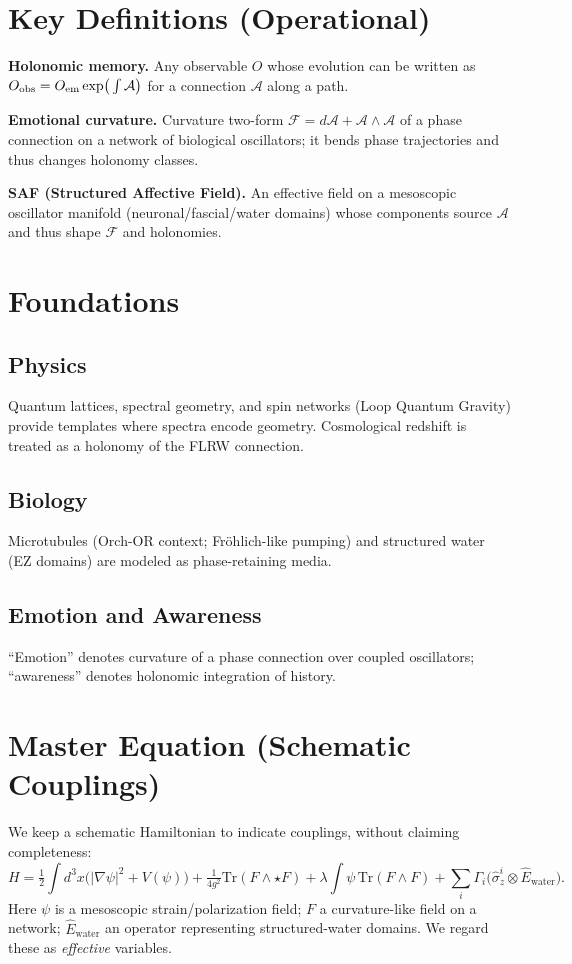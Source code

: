 \documentclass[11pt]{article}
\begin{document}
\section{Key Definitions (Operational)}
\textbf{Holonomic memory.} Any observable $O$ whose evolution can be written as
$O_{\rm obs}=O_{\rm em}\exp\!\big(\int \mathcal{A}\big)$ for a connection $\mathcal{A}$ along a path.
\smallskip

\noindent
\textbf{Emotional curvature.} Curvature two-form $\mathcal{F}=d\mathcal{A}+\mathcal{A}\wedge\mathcal{A}$ of a phase connection
on a network of biological oscillators; it bends phase trajectories and thus changes holonomy classes.
\smallskip

\noindent
\textbf{SAF (Structured Affective Field).} An effective field on a mesoscopic oscillator manifold (neuronal/fascial/water domains)
whose components source $\mathcal{A}$ and thus shape $\mathcal{F}$ and holonomies.

\section{Foundations}
\subsection{Physics}
Quantum lattices, spectral geometry, and spin networks (Loop Quantum Gravity) provide templates where spectra encode geometry.
Cosmological redshift is treated as a holonomy of the FLRW connection.
\subsection{Biology}
Microtubules (Orch-OR context; Fr\"ohlich-like pumping) and structured water (EZ domains) are modeled as phase-retaining media.
\subsection{Emotion and Awareness}
``Emotion'' denotes curvature of a phase connection over coupled oscillators; ``awareness'' denotes holonomic integration of history.

\section{Master Equation (Schematic Couplings)}
We keep a schematic Hamiltonian to indicate couplings, without claiming completeness:
\[
H = \tfrac{1}{2}\!\int d^3x \big(|\nabla \psi|^2 + V(\psi)\big)
+ \tfrac{1}{4g^2} \mathrm{Tr}(F \wedge \star F)
+ \lambda \!\int \psi \, \mathrm{Tr}(F \wedge F)
+ \sum_i \Gamma_i \big(\hat{\sigma}_z^i \otimes \hat{E}_{\text{water}}\big).
\]
Here $\psi$ is a mesoscopic strain/polarization field; $F$ a curvature-like field on a network;
$\hat{E}_{\text{water}}$ an operator representing structured-water domains. We regard these as \emph{effective} variables.
\end{document}
